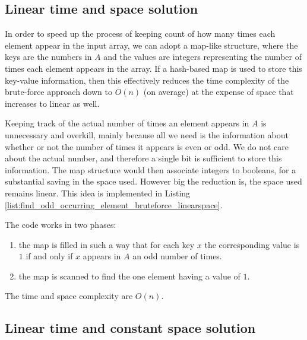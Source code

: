 \subsection{Linear time and space solution}
\label{find_odd_occurring_element:sec:map}

In order to speed up the process of keeping count of how many times each element appear in the input array, we can adopt a map-like structure, where the keys are the numbers in $A$ and the values are integers representing the number of times each element appears in the array.
If a hash-based map is used to store this key-value information, then this effectively reduces the time complexity of the brute-force approach down to $O(n)$ (on average) at the expense of space that increases to linear as well.

Keeping track of the actual number of times an element appears in $A$ is unnecessary and overkill, mainly because all we need is the information about whether or not the number of times it appears is even or odd. We do not care about the actual number, and therefore a single bit is sufficient to store this information. The map structure would then associate integers to booleans, for a substantial saving in the space used. However big the reduction is, the space used remains linear. 
This idea is implemented in Listing \ref{list:find_odd_occurring_element_bruteforce_linearspace}.



The code works in two phases:
\begin{enumerate}
	\item the map  is filled in such a way that for each key $x$ the corresponding value is $1$ if and only if $x$ appears in $A$ an odd number of times.
	\item the map is scanned to find the one element having a value of $1$.
\end{enumerate}
The time and space complexity are $O(n)$.

\subsection{Linear time and constant space solution}
\label{find_odd_occurring_element:sec:constant_space}

